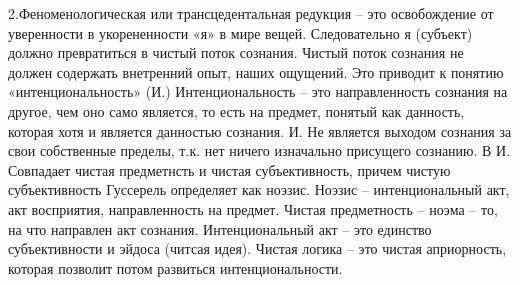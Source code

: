 \documentclass[12pt]{article}
\begin{document}
2.Феноменологическая или трансцедентальная редукция – это освобождение от уверенности в укорененности
«я» в мире вещей. Следовательно я (субъект) должно превратиться в чистый поток сознания.
Чистый поток сознания не должен содержать внетренний опыт, наших ощущений.
Это приводит к понятию «интенциональность» (И.)
Интенциональность – это направленность сознания на другое, чем оно само является, то есть на предмет,
понятый как данность, которая хотя и является данностью сознания. И. Не является выходом сознания за свои
собственные пределы, т.к. нет ничего изначально присущего сознанию. В И. Совпадает чистая предметнсть и
чистая субъективность, причем чистую субъективность Гуссерель определяет как ноэзис.
Ноэзис – интенциональный акт, акт восприятия, направленность на предмет.
Чистая предметность – ноэма – то, на что направлен акт сознания.
Интенциональный акт – это единство субъективности и эйдоса (читсая идея).
Чистая логика – это чистая априорность, которая позволит потом развиться интенциональности.


\newpage
\end{document}
